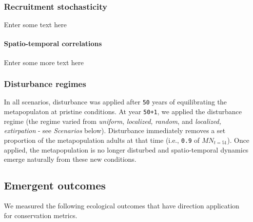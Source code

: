 \documentclass[]{article}
\let\oldparagraph\paragraph
\renewcommand{\paragraph}[1]{\oldparagraph{#1}\mbox{}}
\begin{document}
\subsubsection{Recruitment
stochasticity}\label{recruitment-stochasticity}

Enter some text here

\paragraph{Spatio-temporal
correlations}\label{spatio-temporal-correlations}

Enter some more text here

\subsubsection{Disturbance regimes}\label{disturbance-regimes}

In all scenarios, disturbance was applied after \texttt{50} years of
equilibrating the metapopulaton at pristine conditions. At year
\texttt{50+1}, we applied the disturbance regime (the regime varied from
\emph{uniform}, \emph{localized, random}, and \emph{localized,
extirpation} - see \emph{Scenarios} below). Disturbance immediately
removes a set proportion of the metapopulation adults at that time
(i.e., \texttt{0.9} of \(MN_{t=51}\)). Once applied, the metapopulation
is no longer disturbed and spatio-temporal dynamics emerge naturally
from these new conditions.

\subsection{Emergent outcomes}\label{emergent-outcomes}

We measured the following ecological outcomes that have direction
application for conservation metrics.
\end{document}

